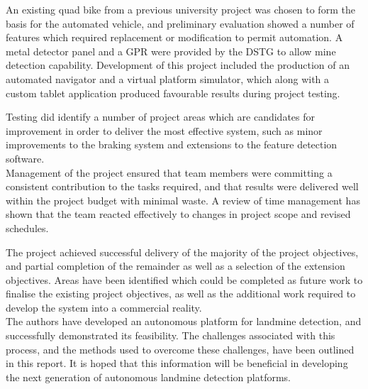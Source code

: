 \documentclass[main.tex]{subfiles}
\begin{document}
An existing quad bike from a previous university project was chosen to form the basis for the automated vehicle, and preliminary evaluation showed a number of features which required replacement or modification to permit automation. 
A metal detector panel and a GPR were provided by the DSTG to allow mine detection capability. 
Development of this project included the production of an automated navigator and a virtual platform simulator, which along with a custom tablet application produced favourable results during project testing.

Testing did identify a number of project areas which are candidates for improvement in order to deliver the most effective system, such as minor improvements to the braking system and extensions to the feature detection software.\\

Management of the project ensured that team members were committing a consistent contribution to the tasks required, and that results were delivered well within the project budget with minimal waste. 
A review of time management has shown that the team reacted effectively to changes in project scope and revised schedules.

The project achieved successful delivery of the majority of the project objectives, and partial completion of the remainder as well as a selection of the extension objectives. Areas have been identified which could be completed as future work to finalise the existing project objectives, as well as the additional work required to develop the system into a commercial reality.\\

The authors have developed an autonomous platform for landmine detection, and successfully demonstrated its feasibility. The challenges associated with this process, and the methods used to overcome these challenges, have been outlined in this report. It is hoped that this information will be beneficial in developing the next generation of autonomous landmine detection platforms.  
\end{document}
